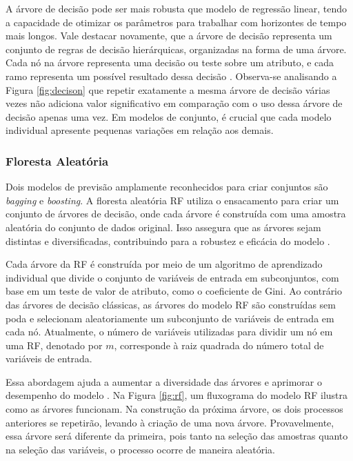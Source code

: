  A árvore de decisão pode ser mais robusta que modelo de regressão linear, tendo a capacidade de otimizar os parâmetros para trabalhar com horizontes de tempo mais longos. Vale destacar novamente, que a árvore de decisão representa um conjunto de regras de decisão hierárquicas, organizadas na forma de uma árvore. Cada nó na árvore representa uma decisão ou teste sobre um atributo, e cada ramo representa um possível resultado dessa decisão \cite{GIFFORD2023100296}. Observa-se analisando a Figura \ref{fig:decison} que repetir exatamente a mesma árvore de decisão várias vezes não adiciona valor significativo em comparação com o uso dessa árvore de decisão apenas uma vez. Em modelos de conjunto, é crucial que cada modelo individual apresente pequenas variações em relação aos demais.
  
 \subsubsection{Floresta Aleat\'oria} \label{subsubsec:rf}
 
Dois modelos de previsão amplamente reconhecidos para criar conjuntos são \textit{bagging} e \textit{boosting}. A floresta aleatória RF utiliza o ensacamento para criar um conjunto de árvores de decisão, onde cada árvore é construída com uma amostra aleatória do conjunto de dados original. Isso assegura que as árvores sejam distintas e diversificadas, contribuindo para a robustez e eficácia do modelo \cite{SEMAN2023109269}.
 
 Cada árvore da RF é construída por meio de um algoritmo de aprendizado individual que divide o conjunto de variáveis de entrada em subconjuntos, com base em um teste de valor de atributo, como o coeficiente de Gini. Ao contrário das árvores de decisão clássicas, as árvores do modelo RF são construídas sem poda e selecionam aleatoriamente um subconjunto de variáveis de entrada em cada nó. Atualmente, o número de variáveis utilizadas para dividir um nó em uma RF, denotado por $m$, corresponde à raiz quadrada do número total de variáveis de entrada. 
 
 Essa abordagem ajuda a aumentar a diversidade das árvores e aprimorar o desempenho do modelo \cite{Pelletier2016156}. Na Figura \ref{fig:rf}, um fluxograma do modelo RF ilustra como as árvores funcionam.
 Na construção da próxima árvore, os dois processos anteriores se repetirão, levando à criação de uma nova árvore. Provavelmente, essa árvore será diferente da primeira, pois tanto na seleção das amostras quanto na seleção das variáveis, o processo ocorre de maneira aleatória.
  
